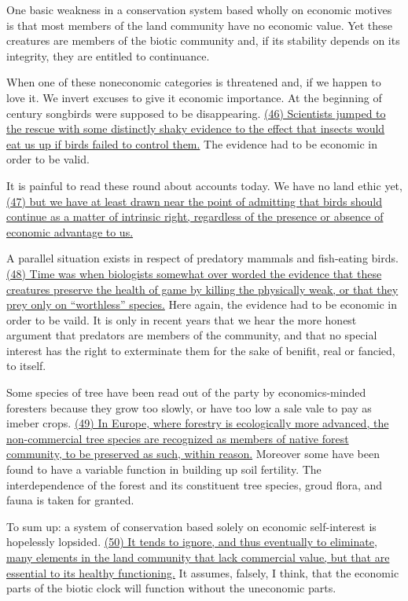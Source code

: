 \qquad One basic weakness in a conservation system based wholly on economic motives is that most members of the land community  have no economic value. Yet these creatures are members of the biotic community and, if its stability depends on its integrity, they are entitled to continuance.

\qquad When one of these noneconomic categories is threatened and, if we happen to love it. We invert excuses to give it economic importance. At the beginning of century songbirds were supposed to be disappearing. \ul{(46) Scientists jumped to the rescue with some distinctly shaky evidence to the effect that insects would eat us up if birds failed to control them.} The evidence had to be economic in order to be valid.

\qquad It is painful to read these round about accounts today. We have no land ethic yet, \ul{(47) but we have at least drawn near the point of admitting that birds should continue as a matter of intrinsic right, regardless of the presence or absence of economic advantage to us.}

\qquad A parallel situation exists in respect of predatory mammals and fish-eating birds. \ul{(48) Time was when biologists somewhat over worded the evidence that these creatures preserve the health of game by killing the physically weak, or that they prey only on “worthless” species.} Here again, the evidence had to be economic in order to be vaild. It is only in recent years that we hear the more honest argument that predators are members of the community, and that no special interest has the right to exterminate them for the sake of benifit, real or fancied, to itself.

\qquad Some species of tree have been read out of the party by economics-minded foresters because they grow too slowly, or have too low a sale vale to pay as imeber crops. \ul{(49) In Europe, where forestry is ecologically more advanced, the non-commercial tree species are recognized as members of native forest community, to be preserved as such, within reason.} Moreover some have been found to have a variable function in building up soil fertility. The interdependence of the forest and its constituent tree species, groud flora, and fauna is taken for granted.

\qquad To sum up: a system of conservation based solely on economic self-interest is hopelessly lopsided. \ul{(50) It tends to ignore, and thus eventually to eliminate, many elements in the land community that lack commercial value, but that are essential to its healthy functioning.} It assumes, falsely, I think, that the economic parts of the biotic clock will function without the uneconomic parts.